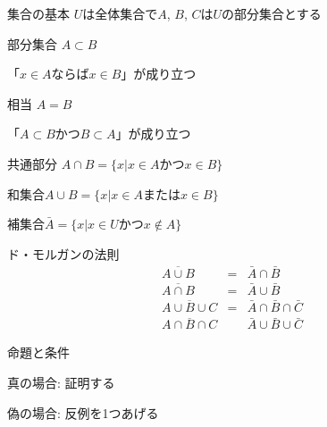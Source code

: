\documentclass[aspectratio=169, 12pt]{beamer}
\begin{document}
\begin{frame}{集合の基本}
    $U$は全体集合で$A$, $B$, $C$は$U$の部分集合とする \par
    部分集合 $A\subset B$ \par
    \begin{center}
        「$x \in A$ならば$x\in B$」が成り立つ\par
    \end{center}
    相当 $A=B$ \par
    \begin{center}
        「$A\subset B$かつ$B\subset A$」が成り立つ \par
    \end{center}

    共通部分 $A\cap B = \{x|x\in A かつ x \in B\}$ \par
    和集合\space\space\space\space $A\cup B = \{x|x\in A または x \in B \}$ \par
    補集合\space\space\space\space\space\space\space\space\space\space $\bar{A}=\{x|x\in U かつ x\notin A\}$
\end{frame}
\begin{frame}{ド・モルガンの法則}
    \begin{eqnarray*}
        \overline{A\cup B}&=&\bar{A}\cap \bar{B} \\
        \overline{A\cap B}&=&\bar{A}\cup \bar{B} \\
        \overline{A\cup B\cup C}&=&\bar{A}\cap\bar{B}\cap\bar{C} \\
        \overline{A\cap B\cap C}&&\bar{A}\cup\bar{B}\cup\bar{C}
    \end{eqnarray*}
\end{frame}
\begin{frame}{命題と条件}
    \begin{center}
        真の場合: 証明する \par
        偽の場合: 反例を1つあげる
    \end{center}
\end{frame}
\end{document}
